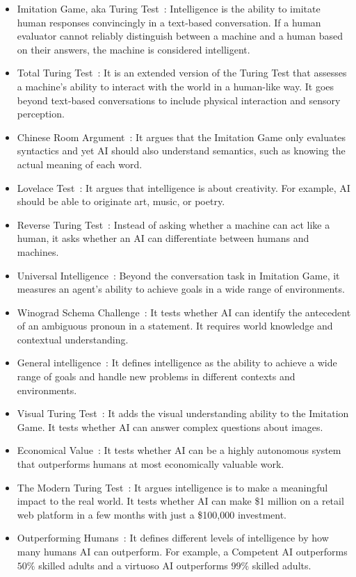 \begin{itemize}
	\item Imitation Game, aka Turing Test~\citep{turing1950computing}: Intelligence is the ability to imitate human responses convincingly in a text-based conversation. If a human evaluator cannot reliably distinguish between a machine and a human based on their answers, the machine is considered intelligent.
	\item Total Turing Test~\citep{harnad1991other}: It is an extended version of the Turing Test that assesses a machine's ability to interact with the world in a human-like way. It goes beyond text-based conversations to include physical interaction and sensory perception.
	\item Chinese Room Argument~\citep{searle1999chinese}: It argues that the Imitation Game only evaluates syntactics and yet AI should also understand semantics, such as knowing the actual meaning of each word.
	\item Lovelace Test~\citep{bringsjord2003creativity}: It argues that intelligence is about creativity. For example, AI should be able to originate art, music, or poetry.
	\item Reverse Turing Test~\citep{baird2003pessimalprint}: Instead of asking whether a machine can act like a human, it asks whether an AI can differentiate between humans and machines. 
	\item Universal Intelligence~\citep{legg2007universal}: Beyond the conversation task in Imitation Game, it measures an agent’s ability to achieve goals in a wide range of environments.
	\item Winograd Schema Challenge~\citep{levesque2012winograd}: It tests whether AI can identify the antecedent of an ambiguous pronoun in a statement. It requires world knowledge and contextual understanding. 
	\item General intelligence~\citep{goertzel}: It defines intelligence as the ability to achieve a wide range of goals and handle new problems in different contexts and environments.
	\item Visual Turing Test~\citep{geman2015visual}: It adds the visual understanding ability to the Imitation Game. It tests whether AI can answer complex questions about images.
	\item Economical Value~\citep{openAICharter}: It tests whether AI can be a highly autonomous system that outperforms humans at most economically valuable work.
	\item The Modern Turing Test~\citep{suleyman2023coming}: It argues intelligence is to make a meaningful impact to the real world. It tests whether AI can make \$1 million on a retail web platform in a few months with just a \$100,000 investment.
	\item Outperforming Humans~\citep{morris2024levels}: It defines different levels of intelligence by how many humans AI can outperform. For example, a Competent AI outperforms $50\%$ skilled adults and a virtuoso AI outperforms $99\%$ skilled adults.
\end{itemize}

